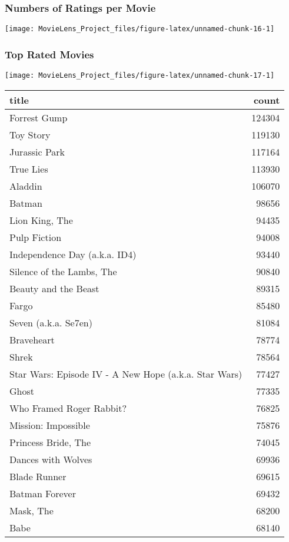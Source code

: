 \documentclass[]{article}
\begin{document}
\hypertarget{numbers-of-ratings-per-movie}{%
\subsubsection{Numbers of Ratings per
Movie}\label{numbers-of-ratings-per-movie}}

\begin{center}\texttt{[image: MovieLens\_Project\_files/figure-latex/unnamed-chunk-16-1]} \end{center}

\hypertarget{top-rated-movies}{%
\subsubsection{Top Rated Movies}\label{top-rated-movies}}

\begin{center}\texttt{[image: MovieLens\_Project\_files/figure-latex/unnamed-chunk-17-1]} \end{center}

\begin{table}[H]
\centering\begingroup\fontsize{10}{12}\selectfont

\begin{tabular}{l|r}
\hline
title & count\\
\hline
Forrest Gump & 124304\\
\hline
Toy Story & 119130\\
\hline
Jurassic Park & 117164\\
\hline
True Lies & 113930\\
\hline
Aladdin & 106070\\
\hline
Batman & 98656\\
\hline
Lion King, The & 94435\\
\hline
Pulp Fiction & 94008\\
\hline
Independence Day (a.k.a. ID4) & 93440\\
\hline
Silence of the Lambs, The & 90840\\
\hline
Beauty and the Beast & 89315\\
\hline
Fargo & 85480\\
\hline
Seven (a.k.a. Se7en) & 81084\\
\hline
Braveheart & 78774\\
\hline
Shrek & 78564\\
\hline
Star Wars: Episode IV - A New Hope (a.k.a. Star Wars) & 77427\\
\hline
Ghost & 77335\\
\hline
Who Framed Roger Rabbit? & 76825\\
\hline
Mission: Impossible & 75876\\
\hline
Princess Bride, The & 74045\\
\hline
Dances with Wolves & 69936\\
\hline
Blade Runner & 69615\\
\hline
Batman Forever & 69432\\
\hline
Mask, The & 68200\\
\hline
Babe & 68140\\
\hline
\end{tabular}
\endgroup{}
\end{table}
\end{document}
